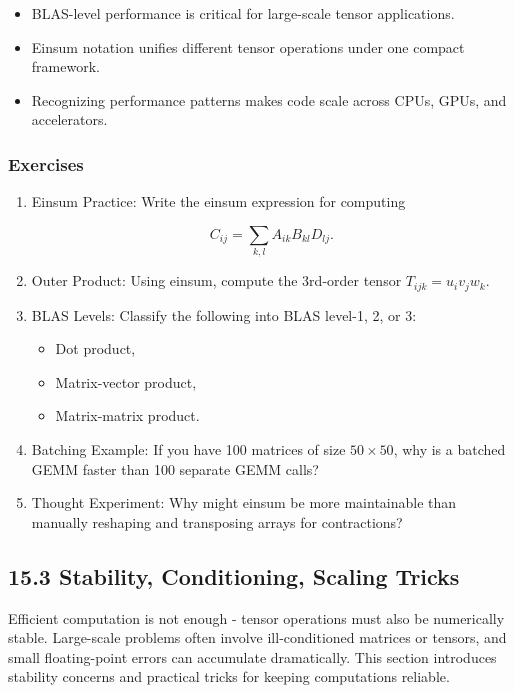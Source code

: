 \documentclass[
  letterpaper,
  DIV=11,
  numbers=noendperiod]{scrreprt}
\providecommand{\tightlist}{%
  \setlength{\itemsep}{0pt}\setlength{\parskip}{0pt}}
\begin{document}
\begin{itemize}
\tightlist
\item
  BLAS-level performance is critical for large-scale tensor
  applications.
\item
  Einsum notation unifies different tensor operations under one compact
  framework.
\item
  Recognizing performance patterns makes code scale across CPUs, GPUs,
  and accelerators.
\end{itemize}

\subsubsection{Exercises}\label{exercises-54}

\begin{enumerate}
\def\labelenumi{\arabic{enumi}.}
\item
  Einsum Practice: Write the einsum expression for computing

  \[
  C_{ij} = \sum_{k,l} A_{ik} B_{kl} D_{lj}.
  \]
\item
  Outer Product: Using einsum, compute the 3rd-order tensor
  \(T_{ijk} = u_i v_j w_k\).
\item
  BLAS Levels: Classify the following into BLAS level-1, 2, or 3:

  \begin{itemize}
  \tightlist
  \item
    Dot product,
  \item
    Matrix-vector product,
  \item
    Matrix-matrix product.
  \end{itemize}
\item
  Batching Example: If you have 100 matrices of size \(50 \times 50\),
  why is a batched GEMM faster than 100 separate GEMM calls?
\item
  Thought Experiment: Why might einsum be more maintainable than
  manually reshaping and transposing arrays for contractions?
\end{enumerate}

\subsection{15.3 Stability, Conditioning, Scaling
Tricks}\label{stability-conditioning-scaling-tricks}

Efficient computation is not enough - tensor operations must also be
numerically stable. Large-scale problems often involve ill-conditioned
matrices or tensors, and small floating-point errors can accumulate
dramatically. This section introduces stability concerns and practical
tricks for keeping computations reliable.
\end{document}
